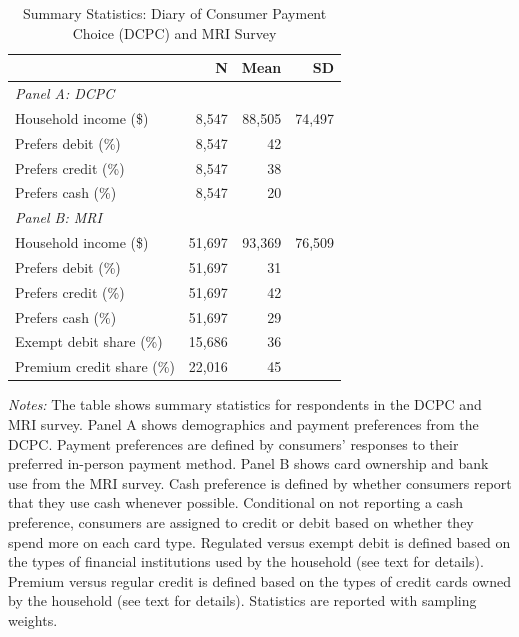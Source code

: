 \documentclass[11pt,english]{article}
\theoremstyle{remark}
\begin{document}
\begin{table}[H]

  \centering
  \caption{Summary Statistics: Diary of Consumer Payment Choice (DCPC) and MRI Survey}
  \label{tab:dcpc-summary-stats}
  \begin{tabular}{lrrr}
\toprule
 & N & Mean & SD \\
\midrule
\multicolumn{4}{l}{\textit{Panel A: DCPC}} \\
\quad Household income (\$) & 8,547 & 88,505 & 74,497 \\
\quad Prefers debit (\%) & 8,547 & 42 &  \\
\quad Prefers credit (\%) & 8,547 & 38 &  \\
\quad Prefers cash (\%) & 8,547 & 20 &  \\

\multicolumn{4}{l}{\textit{Panel B: MRI}} \\
\quad Household income (\$) & 51,697 & 93,369 & 76,509 \\
\quad Prefers debit (\%) & 51,697 & 31 &  \\
\quad Prefers credit (\%) & 51,697 & 42 &  \\
\quad Prefers cash (\%) & 51,697 & 29 &  \\
\quad Exempt debit share (\%) & 15,686 & 36 &  \\
\quad Premium credit share (\%) & 22,016 & 45 &  \\
\bottomrule
\end{tabular}
 
  \par\textit{Notes:} The table shows summary statistics for respondents in the DCPC and MRI survey. Panel A shows demographics and payment preferences from the DCPC. Payment preferences are defined by consumers' responses to their preferred in-person payment method. Panel B shows card ownership and bank use from the MRI survey. Cash preference is defined by whether consumers report that they use cash whenever possible. Conditional on not reporting a cash preference, consumers are assigned to credit or debit based on whether they spend more on each card type. Regulated versus exempt debit is defined based on the types of financial institutions used by the household (see text for details). Premium versus regular credit is defined based on the types of credit cards owned by the household (see text for details). Statistics are reported with sampling weights.
\end{table}
\end{document}
